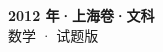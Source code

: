 \documentclass[zihao=-4, a4paper]{ctexart}
\begin{document}
\begin{center}
  {\Large\bfseries 2012 年·上海卷·文科}\\[4pt]
  {\large 数学 · 试题版}
\end{center}
\medskip
{}

\end{document}
